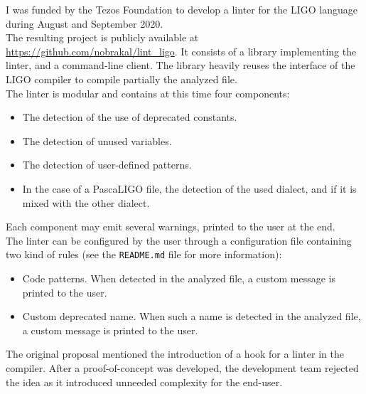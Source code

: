 I was funded by the Tezos Foundation to develop a linter for the LIGO language during August and September 2020.\\
The resulting project is publicly available at \url{https://github.com/nobrakal/lint\_ligo}.
It consists of a library implementing the linter, and a command-line client.
The library heavily reuses the interface of the LIGO compiler to compile partially the analyzed file.\\
The linter is modular and contains at this time four components:

\begin{itemize}
\item The detection of the use of deprecated constants.
\item The detection of unused variables.
\item The detection of user-defined patterns.
\item In the case of a PascaLIGO file, the detection of the used dialect, and if it is mixed with the other dialect.
\end{itemize}

Each component may emit several warnings, printed to the user at the end.\\
The linter can be configured by the user through a configuration file containing two kind of rules (see the \verb|README.md| file for more information):
\begin{itemize}
\item Code patterns. When detected in the analyzed file, a custom message is printed to the user.
\item Custom deprecated name. When such a name is detected in the analyzed file, a custom message is printed to the user.
\end{itemize}

The original proposal mentioned the introduction of a hook for a linter in the compiler. After a proof-of-concept was developed, the development team rejected the idea as it introduced unneeded complexity for the end-user.